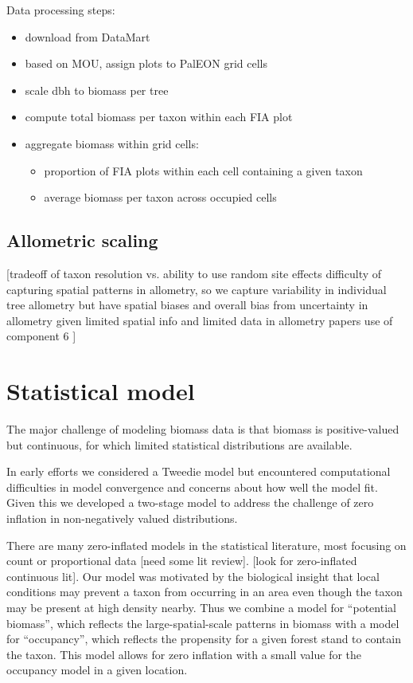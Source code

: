 \documentclass[12pt]{article}\usepackage[]{graphicx}\usepackage[]{color}
\begin{document}
Data processing steps:
\begin{itemize}
\item download from DataMart
\item based on MOU, assign plots to PalEON grid cells
\item scale dbh to biomass per tree
\item compute total biomass per taxon within each FIA plot
\item aggregate biomass within grid cells:

\begin{itemize}
\item proportion of FIA plots within each cell containing a given taxon
\item average biomass per taxon across occupied cells
\end{itemize}
\end{itemize}

\subsection{Allometric scaling}

{[}tradeoff of taxon resolution vs. ability to use random site effects
difficulty of capturing spatial patterns in allometry, so we capture
variability in individual tree allometry but have spatial biases and
overall bias from uncertainty in allometry given limited spatial info
and limited data in allometry papers use of component 6 {]}


\section{Statistical model\label{sec:Statistical-model}}

The major challenge of modeling biomass data is that biomass is positive-valued
but continuous, for which limited statistical distributions are available.

In early efforts we considered a Tweedie model but encountered computational
difficulties in model convergence and concerns about how well the
model fit. Given this we developed a two-stage model to address the
challenge of zero inflation in non-negatively valued distributions.

There are many zero-inflated models in the statistical literature,
most focusing on count or proportional data {[}need some lit review{]}.
{[}look for zero-inflated continuous lit{]}. Our model was motivated
by the biological insight that local conditions may prevent a taxon
from occurring in an area even though the taxon may be present at
high density nearby. Thus we combine a model for ``potential biomass'',
which reflects the large-spatial-scale patterns in biomass with a
model for ``occupancy'', which reflects the propensity for a given
forest stand to contain the taxon. This model allows for zero inflation
with a small value for the occupancy model in a given location.
\end{document}
